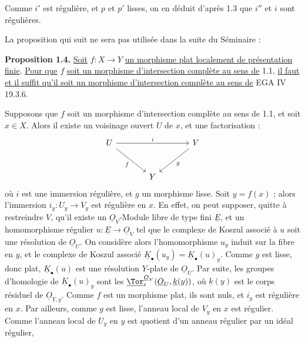 
Comme $i'$ est régulière, et $p$ et $p'$ lisses, on en déduit d'après 1.3 que $i''$ et $i$ sont régulières.

La proposition qui suit ne sera pas utilisée dans la suite du Séminaire :

\textbf{Proposition 1.4.} \uline{Soit} $f:X\to Y$ \uline{un morphisme plat localement de présentation finie}. \uline{Pour que} $f$ \uline{soit un morphisme d'intersection complète au sens de} 1.1, \uline{il faut et il suffit qu'il soit un morphisme d'intersection complète au sens de} EGA IV 19.3.6.

Supposons que $f$ soit un morphisme d'intersection complète au sens de 1.1, et soit $x\in X$. Alors il existe un voisinage ouvert $U$ de $x$, et une factorisation :
\[
\begin{tikzcd}[column sep=large,row sep=large]
U \arrow[rr,"i"] \arrow[dr,"f"'] && V \arrow[dl,"g"]\\
& Y &
\end{tikzcd}
\]
où $i$ est une immersion régulière, et $g$ un morphisme lisse. Soit $y=f(x)$ ; alors l'immersion $i_y:U_y\to V_y$ est régulière en $x$. En effet, on peut supposer, quitte à restreindre $V$, qu'il existe un $\underline{O}_V$-Module libre de type fini $\underline{E}$, et un homomorphisme régulier $u:\underline{E}\to\underline{O}_V$ tel que le complexe de Koszul associé à $u$ soit une résolution de $\underline{O}_U$. On considère alors l'homomorphisme $u_y$ induit sur la fibre en $y$, et le complexe de Koszul associé $\underline{K}_\bullet(u_y)=\underline{K}_\bullet(u)_y$. Comme $g$ est lisse, donc plat, $\underline{K}_\bullet(u)$ est une résolution $Y$-plate de $\underline{O}_U$. Par suite, les groupes d'homologie de $\underline{K}_\bullet(u)_y$ sont les $\underline{\Tor}_i^{\underline{O}_Y}(\underline{O}_U,\underline{k}(y))$, où $\underline{k}(y)$ est le corps résiduel de $\underline{O}_{Y,y}$. Comme $f$ est un morphisme plat, ils sont nuls, et $i_y$ est régulière en $x$. Par ailleurs, comme $g$ est lisse, l'anneau local de $V_y$ en $x$ est régulier. Comme l'anneau local de $U_y$ en $y$ est quotient d'un anneau régulier par un idéal régulier,
